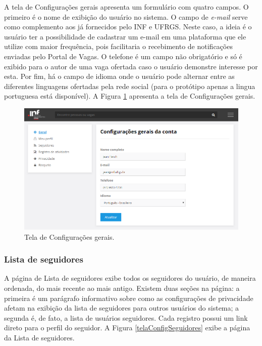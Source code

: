 A tela de Configurações gerais apresenta um formulário com quatro campos. O primeiro é o nome de exibição do usuário no sistema. O campo de \textit{e-mail} serve como complemento aos já fornecidos pelo INF e UFRGS. Neste caso, a ideia é o usuário ter a possibilidade de cadastrar um e-mail em uma plataforma que ele utilize com maior frequência, pois facilitaria o recebimento de notificações enviadas pelo Portal de Vagas. O telefone é um campo não obrigatório e só é exibido para o autor de uma vaga ofertada caso o usuário demonstre interesse por esta. Por fim, há o campo de idioma onde o usuário pode alternar entre as diferentes linguagens ofertadas pela rede social (para o protótipo apenas a lingua portuguesa está disponível). A Figura \ref{telaConfigGeral} apresenta a tela de Configurações gerais.

\begin{figure}[ht]
    \caption{Tela de Configurações gerais.}
       	\begin{center}
            \includegraphics[width=1\textwidth]{figuras/config_01.png}
        \end{center}
    \label{telaConfigGeral}
\end{figure}

\subsubsection{Lista de seguidores}
\label{PDVFunConfiguracoesListaSeguidores}

A página de Lista de seguidores exibe todos os seguidores do usuário, de maneira ordenada, do mais recente ao mais antigo. Existem duas seções na página: a primeira é um parágrafo informativo sobre como as configurações de privacidade afetam na exibição da lista de seguidores para outros usuários do sistema; a segunda é, de fato, a lista de usuários seguidores. Cada registro possui um link direto para o perfil do seguidor. A Figura \ref{telaConfigSeguidores} exibe a página da Lista de seguidores.


